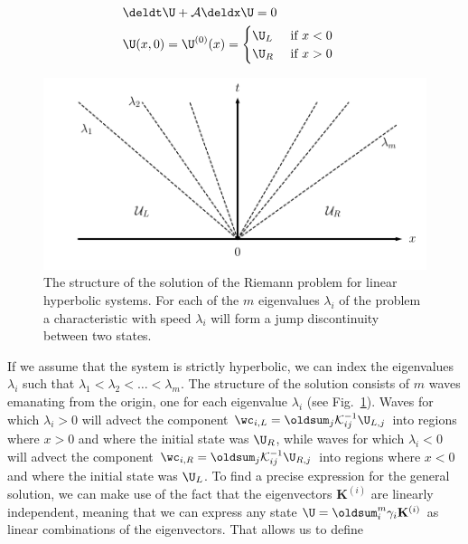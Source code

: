 \begin{align}
    & \deldt \U + \mathcal{A} \deldx \U = 0 && \\
    & \U(x, 0) = \U^{(0)} (x) = \begin{cases}
                               \U_L & \text{ if } x < 0 \\
                               \U_R & \text{ if } x > 0
                              \end{cases} &&
\end{align}



\begin{figure}[H]
    \centering

\includegraphics[width=.7\linewidth]{./figures/FV/riemann_solution_linear_hyperbolic_systems.pdf}%
	\caption[Structure of the solution of the Riemann problem for linear hyperbolic systems]{
	The structure of the solution of the Riemann problem for linear hyperbolic systems. For each of
the $m$ eigenvalues $\lambda_i$ of the problem a characteristic with speed $\lambda_i$ will form a
jump discontinuity between two states.}
    \label{fig:riemann-linear-hyperbolic-system}
\end{figure}


If we assume that the system is strictly hyperbolic, we can index the eigenvalues
$\lambda_i$ such that $\lambda_1 < \lambda_2 < \ldots < \lambda_m$. The structure of the solution
consists of $m$ waves emanating from the origin, one for each eigenvalue $\lambda_i$ (see
Fig.~\ref{fig:riemann-linear-hyperbolic-system}). Waves for which $\lambda_i > 0$ will advect the
component $\wc_{i,L} = \oldsum_j \mathcal{K}_{ij}^{-1}\U_{L,j}$ into regions where $x > 0$ and
where the initial state was $\U_R$, while waves for which $\lambda_i < 0$ will advect the component
$\wc_{i,R} = \oldsum_j \mathcal{K}_{ij}^{-1}\U_{R,j}$ into regions where $x < 0$ and where the
initial state was $\U_L$.
To find a precise expression for the general solution, we can make use of the fact that the
eigenvectors $\mathbf{K}^{(i)}$ are linearly independent, meaning that we can express any state $\U
= \oldsum_i^m \gamma_i \mathbf{K}^{(i)}$ as linear combinations of the eigenvectors. That allows us
to define


